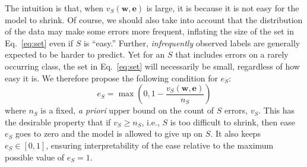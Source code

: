 \documentclass{article} %
\begin{document}
The intuition is that, when $v_S(\mathbf{w},\mathbf{e})$ 
is large, it is because it is not easy for the
model to shrink.  Of course, we should also take into account 
that the distribution of the data may make some errors more frequent,
inflating the size of the set in Eq.~\ref{eq:set} even if $S$ is ``easy.''
Further,  \emph{infrequently} observed labels are generally
expected to be harder to predict.  Yet for an $S$ that includes errors on
a  rarely occurring class, the set in Eq.~\ref{eq:set} will
necessarily be small, regardless of how easy it is.
We therefore propose the following condition for $e_S$:
\begin{equation}
e_S = \max\left( 0, 1 - \frac{v_S(\mathbf{w}, \mathbf{e}) }{n_S}\right) \label{e-condition}
\end{equation}
where $n_S$ is a fixed, \emph{a priori} upper bound on the count of
$S$ errors, $v_S$.   This
has the desirable property that  if $v_S \ge n_S$,  i.e., $S$ is too
difficult to shrink, then ease $e_S$ goes to zero and the model is
allowed to give up on $S$.  It also keeps $e_S \in [0,1]$, 
ensuring interpretability of the ease relative to the
maximum possible value of $e_S=1$.

\end{document}
